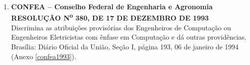 \begin{enumerate}
      \item \textbf{CONFEA – Conselho Federal de Engenharia e Agronomia} \\
            \textbf{RESOLUÇÃO N\textsuperscript{o} 380, DE 17 DE DEZEMBRO DE 1993}  \\
            Discrimina as atribuições provisórias dos Engenheiros de Computação ou Engenheiros Eletricistas com ênfase em Computação e dá outras providências. Brasília: Diário Oficial da União, Seção I, página 193, 06 de janeiro de 1994 (Anexo \ref{confea1993}).
\end{enumerate}
